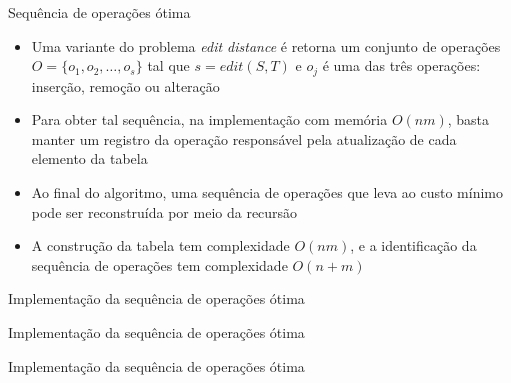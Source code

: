 \begin{frame}[fragile]{Sequência de operações ótima}

    \begin{itemize}
        \item Uma variante do problema {\it edit distance} é retorna um conjunto de operações
            $O = \lbrace o_1, o_2, \ldots, o_s\rbrace$ tal que $s = edit(S, T)$ e $o_j$ é uma
            das três operações: inserção, remoção ou alteração

        \item Para obter tal sequência, na implementação com memória $O(nm)$, basta manter um 
            registro da operação responsável pela atualização de cada elemento da tabela

        \item Ao final do algoritmo, uma sequência de operações que leva ao custo mínimo pode
            ser reconstruída por meio da recursão

        \item A construção da tabela tem complexidade $O(nm)$, e a identificação da sequência
            de operações tem complexidade $O(n + m)$
    \end{itemize}

\end{frame}

\begin{frame}[fragile]{Implementação da sequência de operações ótima}
\end{frame}

\begin{frame}[fragile]{Implementação da sequência de operações ótima}
\end{frame}

\begin{frame}[fragile]{Implementação da sequência de operações ótima}
\end{frame}
